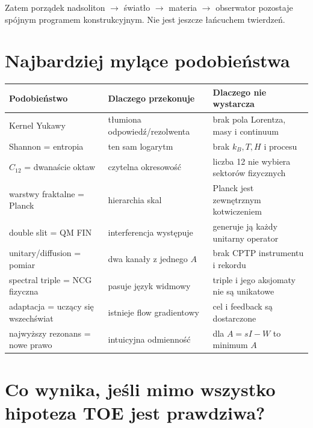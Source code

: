 \documentclass[11pt,a4paper]{article}
\begin{document}
Zatem porządek nadsoliton $\to$ światło $\to$ materia $\to$ obserwator pozostaje spójnym programem konstrukcyjnym. Nie jest jeszcze łańcuchem twierdzeń.

\section{Najbardziej mylące podobieństwa}

\begin{longtable}{@{}p{}p{}p{}@{}}
\toprule
Podobieństwo & Dlaczego przekonuje & Dlaczego nie wystarcza\\
\midrule
Kernel Yukawy & tłumiona odpowiedź/rezolwenta & brak pola Lorentza, masy i continuum\\
Shannon = entropia & ten sam logarytm & brak $k_B,T,H$ i procesu\\
$C_{12}$ = dwanaście oktaw & czytelna okresowość & liczba 12 nie wybiera sektorów fizycznych\\
warstwy fraktalne = Planck & hierarchia skal & Planck jest zewnętrznym kotwiczeniem\\
double slit = QM FIN & interferencja występuje & generuje ją każdy unitarny operator\\
unitary/diffusion = pomiar & dwa kanały z jednego $A$ & brak CPTP instrumentu i rekordu\\
spectral triple = NCG fizyczna & pasuje język widmowy & triple i jego aksjomaty nie są unikatowe\\
adaptacja = uczący się wszechświat & istnieje flow gradientowy & cel i feedback są dostarczone\\
najwyższy rezonans = nowe prawo & intuicyjna odmienność & dla $A=sI-W$ to minimum $A$\\
\bottomrule
\end{longtable}

\section{Co wynika, jeśli mimo wszystko hipoteza TOE jest prawdziwa?}
\end{document}
